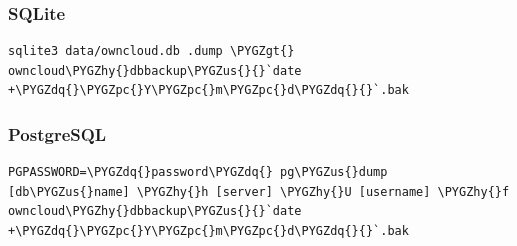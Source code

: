 \documentclass[letterpaper,10pt,english]{sphinxmanual}
\def\PYGZus{\char`\_}
\def\PYGZgt{\char`\>}
\def\PYGZpc{\char`\%}
\def\PYGZhy{\char`\-}
\def\PYGZdq{\char`\"}
\begin{document}
\subsubsection{SQLite}
\label{maintenance/backup:sqlite}
\begin{Verbatim}[commandchars=\\\{\}]
sqlite3 data/owncloud.db .dump \PYGZgt{} owncloud\PYGZhy{}dbbackup\PYGZus{}{}`date +\PYGZdq{}\PYGZpc{}Y\PYGZpc{}m\PYGZpc{}d\PYGZdq{}{}`.bak
\end{Verbatim}


\subsubsection{PostgreSQL}
\label{maintenance/backup:postgresql}
\begin{Verbatim}[commandchars=\\\{\}]
PGPASSWORD=\PYGZdq{}password\PYGZdq{} pg\PYGZus{}dump [db\PYGZus{}name] \PYGZhy{}h [server] \PYGZhy{}U [username] \PYGZhy{}f owncloud\PYGZhy{}dbbackup\PYGZus{}{}`date +\PYGZdq{}\PYGZpc{}Y\PYGZpc{}m\PYGZpc{}d\PYGZdq{}{}`.bak
\end{Verbatim}
\end{document}
